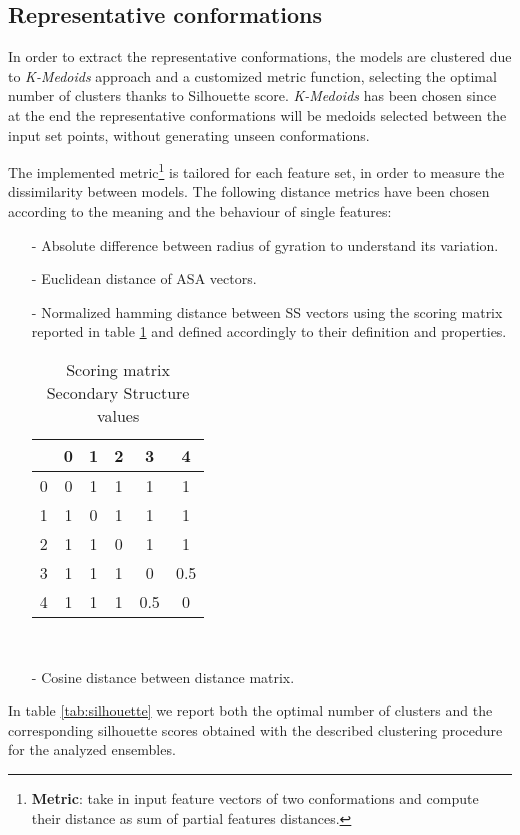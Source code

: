 \subsection{Representative conformations}
In order to extract the representative conformations, the models are clustered due to \emph{K-Medoids} approach and a customized metric function, selecting the optimal number of clusters thanks to Silhouette score.
\emph{K-Medoids} has been chosen since at the end the representative conformations will be medoids selected between the input set points, without generating unseen conformations.

\medskip
The implemented metric\footnote{\textbf{Metric}: take in input feature vectors of two conformations and compute their distance as sum of partial features distances.} is tailored for each feature set, in order to measure the dissimilarity between models. The following distance metrics have been chosen according to the meaning and the behaviour of single features:
\begin{itemize}
\item[-] Absolute difference between radius of gyration to understand its variation.
\item[-] Euclidean distance of ASA vectors.
\item[-] Normalized hamming distance between SS vectors using the scoring matrix reported in table \ref{tab:score} and defined accordingly to their definition and properties.

\begin{table}[H]
\begin{center}
\begin{tabular}{c|ccccc}
& 0 & 1 & 2 & 3 & 4 \\
\hline
0 & 0 & 1 & 1 & 1 & 1\\
1 & 1 & 0 & 1 & 1 & 1\\
2 & 1 & 1 & 0 & 1 & 1\\
3 & 1 & 1 & 1 & 0 & 0.5\\
4 & 1 & 1 & 1 & 0.5 & 0\\
\end{tabular}
\end{center}
\caption{Scoring matrix Secondary Structure values}~\label{tab:score}
\end{table}

\item[-] Cosine distance between distance matrix.
\end{itemize}

In table \ref{tab:silhouette} we report both the optimal number of clusters and the corresponding silhouette scores obtained with the described clustering procedure for the analyzed ensembles.

